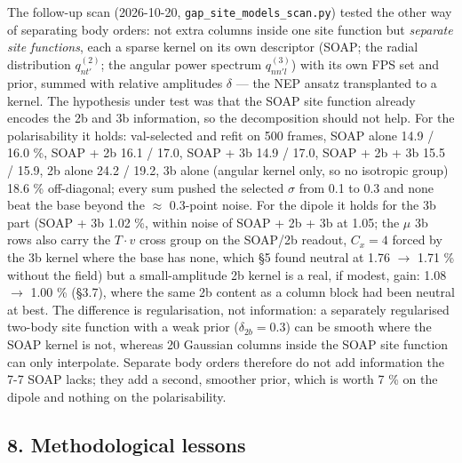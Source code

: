 \documentclass[
  10pt,
]{article}
\newcounter{none} %
\begin{document}
The follow-up scan (2026-10-20, \texttt{gap\_site\_models\_scan.py}) tested the other way of
separating body orders: not extra columns inside one site function but \emph{separate site
functions}, each a sparse kernel on its own descriptor (SOAP; the radial distribution
\(q^{(2)}_{nt'}\); the angular power spectrum \(q^{(3)}_{nn'l}\)) with its own FPS set and prior,
summed with relative amplitudes \(\delta\) --- the NEP ansatz transplanted to a kernel. The
hypothesis under test was that the SOAP site function already encodes the 2b and 3b information, so
the decomposition should not help. For the polarisability it holds: val-selected and refit on 500
frames, SOAP alone 14.9 / 16.0 \%, SOAP + 2b 16.1 / 17.0, SOAP + 3b 14.9 / 17.0, SOAP + 2b + 3b 15.5
/ 15.9, 2b alone 24.2 / 19.2, 3b alone (angular kernel only, so no isotropic group) 18.6 \%
off-diagonal; every sum pushed the selected \(\sigma\) from 0.1 to 0.3 and none beat the base beyond
the \(\approx\) 0.3-point noise. For the dipole it holds for the 3b part (SOAP + 3b 1.02 \%, within
noise of SOAP + 2b + 3b at 1.05; the \(\mu\) 3b rows also carry the \(T\cdot v\) cross group on the
SOAP/2b readout, \(C_x=4\) forced by the 3b kernel where the base has none, which §5 found neutral
at 1.76 \(\rightarrow\) 1.71 \% without the field) but a small-amplitude 2b kernel is a real, if
modest, gain: 1.08 \(\rightarrow\) 1.00 \% (§3.7), where the same 2b content as a column block had
been neutral at best. The difference is regularisation, not information: a separately regularised
two-body site function with a weak prior (\(\delta_{2b}=0.3\)) can be smooth where the SOAP kernel
is not, whereas 20 Gaussian columns inside the SOAP site function can only interpolate. Separate
body orders therefore do not add information the 7-7 SOAP lacks; they add a second, smoother prior,
which is worth 7 \% on the dipole and nothing on the polarisability.

\subsection{8. Methodological lessons}\label{methodological-lessons}
\end{document}

